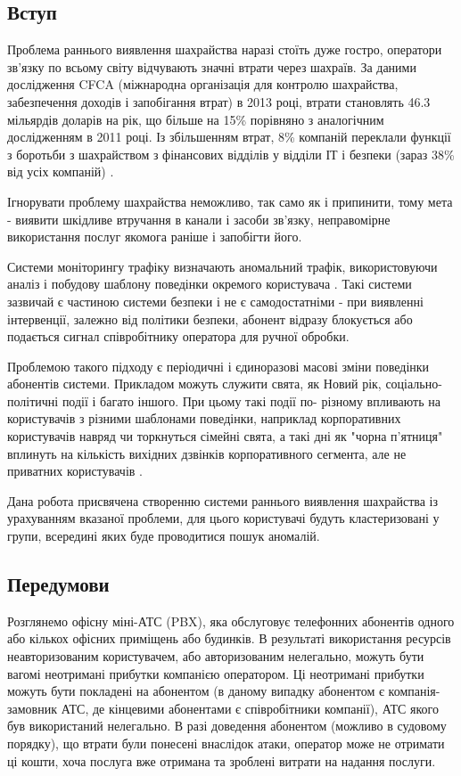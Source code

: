 \newpage
{}
\subsection{Вступ}
  
  Проблема раннього виявлення шахрайства наразі стоїть дуже гостро, оператори зв'язку по всьому світу відчувають значні втрати через шахраїв. За даними дослідження CFCA (міжнародна організація для контролю шахрайства, забезпечення доходів і запобігання втрат) в 2013 році, втрати становлять 46.3 мільярдів доларів на рік, що більше на 15\% порівняно з аналогічним дослідженням в 2011 році. Із збільшенням втрат, 8\% компаній переклали функції з боротьби з шахрайством з фінансових відділів у відділи ІТ і безпеки (зараз 38\% від усіх компаній) \cite{cfca2013survey}.

  Ігнорувати проблему шахрайства неможливо, так само як і припинити, тому мета - виявити шкідливе втручання в канали і засоби зв'язку, неправомірне використання послуг якомога раніше і запобігти його.

  Системи моніторингу трафіку визначають аномальний трафік, використовуючи аналіз і побудову шаблону поведінки окремого користувача \cite{telenik2009detection} \cite{rosastelecommunications}. Такі системи зазвичай є частиною системи безпеки і не є самодостатніми - при виявленні інтервенції, залежно від політики безпеки, абонент відразу блокується або подається сигнал співробітнику оператора для ручної обробки.

  Проблемою такого підходу є періодичні і єдиноразові масові зміни поведінки абонентів системи. Прикладом можуть служити свята, як Новий рік, соціально-політичні події і багато іншого. При цьому такі події по- різному впливають на користувачів з різними шаблонами поведінки, наприклад корпоративних користувачів навряд чи торкнуться сімейні свята, а такі дні як "чорна п'ятниця" вплинуть на кількість вихідних дзвінків корпоративного сегмента, але не приватних користувачів \cite{rader2014cdr}.

  Дана робота присвячена створенню системи раннього виявлення шахрайства із урахуванням вказаної проблеми, для цього користувачі будуть кластеризовані у групи, всередині яких буде проводитися пошук аномалій.

\subsection{Передумови}
	Розглянемо офісну міні-АТС (PBX), яка обслуговує телефонних абонентів одного або кількох офісних приміщень або будинків. В результаті використання ресурсів неавторизованим користувачем, або авторизованим нелегально, можуть бути вагомі неотримані прибутки компанією оператором. Ці неотримані прибутки можуть бути покладені на абонентом (в даному випадку абонентом є компанія-замовник АТС, де кінцевими абонентами є співробітники компанії), АТС якого був використаний нелегально. В разі доведення абонентом (можливо в судовому порядку), що втрати були понесені внаслідок атаки, оператор може не отримати ці кошти, хоча послуга вже отримана та зроблені витрати на надання послуги.

